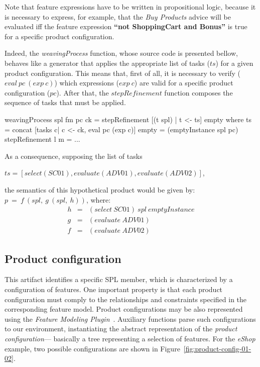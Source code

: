 Note that feature expressions have to be written in propositional
logic, because it is necessary to express, for example, that the \emph{Buy Products} advice will be evaluated iff the feature expression {\bf ``not ShoppingCart and Bonus''} is true for a specific product configuration.

Indeed, the \emph{weavingProcess} function, whose source code is presented bellow, behaves like a generator that applies 
the appropriate list of tasks ($ts$) for a given product configuration. This means 
that, first of all, it is necessary to verify  ($eval\ pc\ (exp\ c)$) which expressions ($exp\ c$) 
are valid for a specific product configuration ($pc$). After that, the
$stepRefinement$ function composes the sequence of tasks that must be applied. 

\begin{code}
weavingProcess spl fm pc ck =
   stepRefinement [(t spl) | t <- ts] empty 
   where
    ts = concat [tasks c| c <- ck, eval pc (exp c)] 
    empty = (emptyInstance spl pc)
    stepRefinement l m = ...
 \end{code}
 
As a consequence, supposing the list of tasks
 
\begin{center}
$ts=[select(SC01),evaluate(ADV01),evaluate(ADV02)]$,
\end{center}

\noindent 
the semantics of this hypothetical product would be given by: $p\ =\  f\ (spl,\ g\ (spl,\ h))$, where:
\begin{eqnarray*}
h  & = & (select\ SC01)\ spl\ emptyInstance \\
g  & = & (evaluate\ ADV01) \\
f   & = & (evaluate\ ADV02) 
\end{eqnarray*}

\indent

\subsection{Product configuration}\label{subsub:pc}

This artifact identifies a specific SPL member, which is characterized by a
configuration of features. One important property is that each product
configuration must comply to the relationships and constraints specified in the 
corresponding feature model.
Product configurations may be also represented using the \emph{Feature Modeling Plugin}~\cite{Czarnecki:2004aa}. Auxiliary functions parse such configurations to our
environment, instantiating the abstract representation of the \emph{product
configuration}--- basically a tree representing a selection of features. For the
\emph{eShop} example, two possible configurations are shown in
Figure~\ref{fig:product-config-01-02}.

